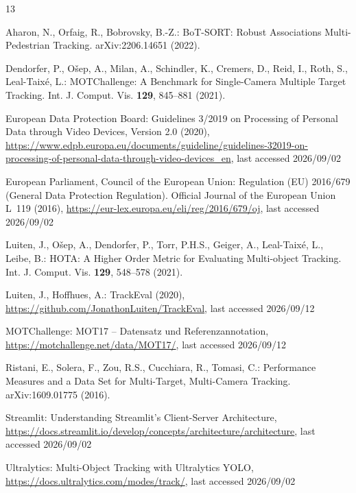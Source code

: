 \documentclass[runningheads]{llncs}
\begin{document}
\begin{thebibliography}{13}

Aharon, N., Orfaig, R., Bobrovsky, B.-Z.: BoT-SORT: Robust Associations Multi-Pedestrian Tracking. arXiv:2206.14651 (2022). 

Dendorfer, P., O\v{s}ep, A., Milan, A., Schindler, K., Cremers, D., Reid, I., Roth, S., Leal-Taix\'e, L.: MOTChallenge: A Benchmark for Single-Camera Multiple Target Tracking. Int. J. Comput. Vis. \textbf{129}, 845--881 (2021). 

European Data Protection Board: Guidelines 3/2019 on Processing of Personal Data through Video Devices, Version 2.0 (2020), \url{https://www.edpb.europa.eu/documents/guideline/guidelines-32019-on-processing-of-personal-data-through-video-devices_en}, last accessed 2026/09/02

European Parliament, Council of the European Union: Regulation (EU) 2016/679 (General Data Protection Regulation). Official Journal of the European Union L~119 (2016), \url{https://eur-lex.europa.eu/eli/reg/2016/679/oj}, last accessed 2026/09/02

Luiten, J., O\v{s}ep, A., Dendorfer, P., Torr, P.H.S., Geiger, A., Leal-Taix\'e, L., Leibe, B.: HOTA: A Higher Order Metric for Evaluating Multi-object Tracking. Int. J. Comput. Vis. \textbf{129}, 548--578 (2021). 

Luiten, J., Hoffhues, A.: TrackEval (2020), \url{https://github.com/JonathonLuiten/TrackEval}, last accessed 2026/09/12

MOTChallenge: MOT17 -- Datensatz und Referenzannotation, \url{https://motchallenge.net/data/MOT17/}, last accessed 2026/09/12

Ristani, E., Solera, F., Zou, R.S., Cucchiara, R., Tomasi, C.: Performance Measures and a Data Set for Multi-Target, Multi-Camera Tracking. arXiv:1609.01775 (2016). 

Streamlit: Understanding Streamlit's Client-Server Architecture, \url{https://docs.streamlit.io/develop/concepts/architecture/architecture}, last accessed 2026/09/02

Ultralytics: Multi-Object Tracking with Ultralytics YOLO, \url{https://docs.ultralytics.com/modes/track/}, last accessed 2026/09/02


\end{thebibliography}
\end{document}
